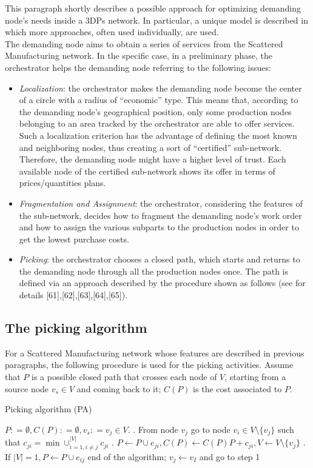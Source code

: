 This paragraph shortly describes a possible approach for optimizing demanding node’s needs inside a 3DPs network. In particular, a unique model is described in which more approaches, often used individually, are used.\\
The demanding node aims to obtain a series of services from the Scattered Manufacturing network. In the specific case, in a preliminary phase, the orchestrator helps the demanding node referring to the following issues:
\begin{itemize}
    \item \textit{Localization}: the orchestrator makes the demanding node become the center of a circle with a radius of “economic” type. This means that, according to the demanding node’s geographical position, only some production nodes belonging to an area tracked by the orchestrator are able to offer services. Such a localization criterion has the advantage of defining the most known and neighboring nodes, thus creating a sort of “certified” sub-network. Therefore, the demanding node might have a higher level of trust. Each available node of the certified sub-network shows its offer in terms of prices/quantities plans.
    \item \textit{Fragmentation and Assignment}: the orchestrator, considering the features of the sub-network, decides how to fragment the demanding node’s work order and how to assign the various subparts to the production nodes in order to get the lowest purchase costs.
    \item \textit{Picking}: the orchestrator chooses a closed path, which starts and returns to the demanding node through all the production nodes once. The path is defined via an approach described by the procedure shown as follows (see for details [61],[62],[63],[64],[65]).
\end{itemize}

\subsection{The picking algorithm}
For a Scattered Manufacturing network whose features are described in previous paragraphs, the following procedure is used for the picking activities. Assume that $P$ is a possible closed path that crosses each node of $V$, starting from a source node $ v_s \in V$ and coming back to it; $C(P)$ is the cost associated to $P$.
\begin{algorithm}
    \caption{Picking algorithm (PA)}
    \label{listing7}
    \begin{algorithmic}[1]
        \State $P : = \emptyset, C(P) : = \emptyset, v_s : = v_j \in V$.
        \EndProcedure
        . From node $v_j$ go to node $v_i \in V\setminus\{v_j\}$ such that $c_{ji} = \min\cup^{|V|}_{i=1,i\neq j} c_{ji}$
        . $P \leftarrow P \cup e_{ji}, C(P) \leftarrow C(P)P + c_{ji}, V \leftarrow V\setminus \{v_j\}$ 
        . \If If $|V| = 1, P \leftarrow P\cup e_{ij}$ \Return end of the algorithm; \Else  $v_j \leftarrow v_I$ and go to step 1 \EndIf
        \EndProcedure
    \end{algorithmic} 
\end{algorithm}

